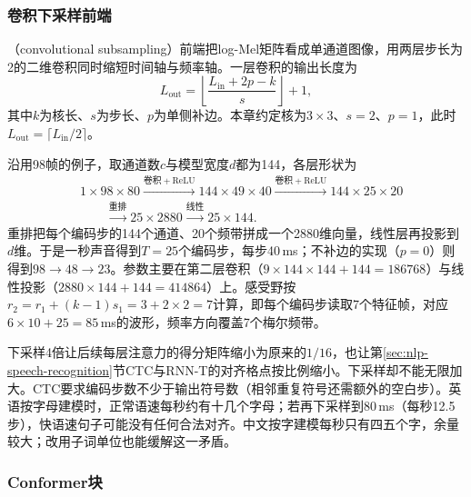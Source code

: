 \subsubsection{卷积下采样前端}
\label{sec:nlp-speech-subsampling}

（convolutional subsampling）前端把log-Mel矩阵看成单通道图像，用两层步长为2的二维卷积同时缩短时间轴与频率轴。一层卷积的输出长度为
\begin{equation}
 L_{\mathrm{out}}=\left\lfloor\frac{L_{\mathrm{in}}+2p-k}{s}\right\rfloor+1,
 \label{eq:nlp-speech-conv-length}
\end{equation}
其中$k$为核长、$s$为步长、$p$为单侧补边。本章约定核为$3\times3$、$s=2$、$p=1$，此时$L_{\mathrm{out}}=\lceil L_{\mathrm{in}}/2\rceil$。

沿用98帧的例子，取通道数$c$与模型宽度$d$都为144，各层形状为
\[
 \begin{aligned}
 &1\times98\times80
 \xrightarrow{\text{卷积}+\mathrm{ReLU}}
 144\times49\times40
 \xrightarrow{\text{卷积}+\mathrm{ReLU}}
 144\times25\times20\\
 &\qquad\xrightarrow{\text{重排}}
 25\times2880
 \xrightarrow{\text{线性}}
 25\times144 .
 \end{aligned}
\]
重排把每个编码步的144个通道、20个频带拼成一个2880维向量，线性层再投影到$d$维。于是一秒声音得到$T=25$个编码步，每步40\,ms；不补边的实现（$p=0$）则得到$98\to48\to23$。参数主要在第二层卷积（$9\times144\times144+144=186768$）与线性投影（$2880\times144+144=414864$）上。感受野按$r_2=r_1+(k-1)s_1=3+2\times2=7$计算，即每个编码步读取7个特征帧，对应$6\times10+25=85$\,ms的波形，频率方向覆盖7个梅尔频带。

下采样4倍让后续每层注意力的得分矩阵缩小为原来的$1/16$，也让第\ref{sec:nlp-speech-recognition}节CTC与RNN-T的对齐格点按比例缩小。下采样却不能无限加大。CTC要求编码步数不少于输出符号数（相邻重复符号还需额外的空白步）。英语按字母建模时，正常语速每秒约有十几个字母；若再下采样到80\,ms（每秒12.5步），快语速句子可能没有任何合法对齐。中文按字建模每秒只有四五个字，余量较大；改用子词单位也能缓解这一矛盾。

\subsubsection{Conformer块}
\label{sec:nlp-speech-conformer}


